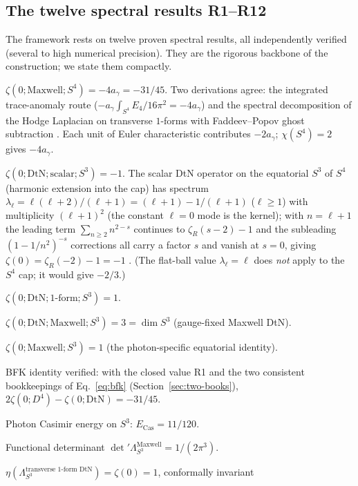 \documentclass[11pt,a4paper]{article}
\theoremstyle{plain}
\theoremstyle{definition}
\theoremstyle{remark}
\newcommand{\ag}{a_\gamma}
\begin{document}
\subsection{The twelve spectral results R1--R12}
The framework rests on twelve proven spectral results, all independently verified (several to
high numerical precision). They are the rigorous backbone of the construction; we state them
compactly.
\begin{description}[leftmargin=2.6em,nosep,itemsep=2pt]
\item[R1.] $\zeta(0;\mathrm{Maxwell};S^4) = -4\ag = -31/45$. Two derivations agree: the
integrated trace-anomaly route ($-\ag\int_{S^4}E_4/16\pi^2 = -4\ag$) and the spectral
decomposition of the Hodge Laplacian on transverse $1$-forms with Faddeev--Popov ghost
subtraction \cite{ChristensenDuff1980,Vassilevich2003}. Each unit of Euler characteristic
contributes $-2\ag$; $\chi(S^4)=2$ gives $-4\ag$.
\item[R2.] $\zeta(0;\mathrm{DtN};\mathrm{scalar};S^3) = -1$. The scalar DtN operator on the
equatorial $S^3$ of $S^4$ (harmonic extension into the cap) has spectrum
$\lambda_\ell = \ell(\ell+2)/(\ell+1) = (\ell+1)-1/(\ell+1)$ ($\ell\ge1$) with multiplicity
$(\ell+1)^2$ (the constant $\ell=0$ mode is the kernel); with $n=\ell+1$ the leading term
$\sum_{n\ge2}n^{2-s}$ continues to $\zeta_R(s-2)-1$ and the subleading $(1-1/n^2)^{-s}$
corrections all carry a factor $s$ and vanish at $s=0$, giving $\zeta(0)=\zeta_R(-2)-1 = -1$
\cite{Vassilevich2003}. (The flat-ball value $\lambda_\ell=\ell$ does \emph{not} apply to the
$S^4$ cap; it would give $-2/3$.)
\item[R3.] $\zeta(0;\mathrm{DtN};\text{1-form};S^3) = 1$.
\item[R4.] $\zeta(0;\mathrm{DtN};\mathrm{Maxwell};S^3) = 3 = \dim S^3$ (gauge-fixed Maxwell DtN).
\item[R5.] $\zeta(0;\mathrm{Maxwell};S^3) = 1$ (the photon-specific equatorial identity).
\item[R6.] BFK identity verified: with the closed value R1 and the two consistent bookkeepings
of Eq.~\eqref{eq:bfk} (Section~\ref{sec:two-books}), $2\zeta(0;D^4)-\zeta(0;\mathrm{DtN}) = -31/45$.
\item[R7.] Photon Casimir energy on $S^3$: $E_{\mathrm{Cas}} = 11/120$.
\item[R8.] Functional determinant ${\det}'\Lambda_{S^3}^{\mathrm{Maxwell}} = 1/(2\pi^3)$.
\item[R9.] $\eta(\Lambda_{S^3}^{\text{transverse 1-form DtN}}) = \zeta(0) = 1$, conformally invariant

\end{description}
\end{document}
